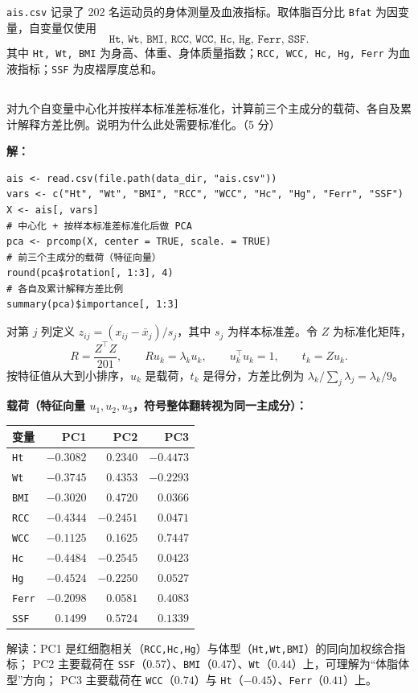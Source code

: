 \documentclass[12pt,a4paper]{article}
\begin{document}
\texttt{ais.csv} 记录了 202 名运动员的身体测量及血液指标。取体脂百分比 \texttt{Bfat} 为因变量，自变量仅使用
\[
  \texttt{Ht, Wt, BMI, RCC, WCC, Hc, Hg, Ferr, SSF}.
\]
其中 \texttt{Ht, Wt, BMI} 为身高、体重、身体质量指数；\texttt{RCC, WCC, Hc, Hg, Ferr} 为血液指标；\texttt{SSF} 为皮褶厚度总和。

\subsection{}

对九个自变量中心化并按样本标准差标准化，计算前三个主成分的载荷、各自及累计解释方差比例。说明为什么此处需要标准化。（5 分）

\begin{answerbox}
\textbf{解：}

\begin{lstlisting}[style=rcode]
ais <- read.csv(file.path(data_dir, "ais.csv"))
vars <- c("Ht", "Wt", "BMI", "RCC", "WCC", "Hc", "Hg", "Ferr", "SSF")
X <- ais[, vars]
# 中心化 + 按样本标准差标准化后做 PCA
pca <- prcomp(X, center = TRUE, scale. = TRUE)
# 前三个主成分的载荷（特征向量）
round(pca$rotation[, 1:3], 4)
# 各自及累计解释方差比例
summary(pca)$importance[, 1:3]  
\end{lstlisting}

对第 $j$ 列定义 $z_{ij}=(x_{ij}-\bar x_j)/s_j$，其中 $s_j$ 为样本标准差。令 $Z$ 为标准化矩阵，
$$
R=\frac{Z^\top Z}{201},\qquad Ru_k=\lambda_ku_k,\qquad
u_k^\top u_k=1,\qquad t_k=Zu_k.
$$
按特征值从大到小排序，$u_k$ 是载荷，$t_k$ 是得分，方差比例为 $\lambda_k/\sum_j\lambda_j=\lambda_k/9$。

\textbf{载荷（特征向量 $u_1,u_2,u_3$，符号整体翻转视为同一主成分）：}
\begin{center}
\small
\begin{tabular}{lrrr}
\toprule
变量 & PC1 & PC2 & PC3 \\
\midrule
\texttt{Ht} & $-0.3082$ & $0.2340$ & $-0.4473$ \\
\texttt{Wt} & $-0.3745$ & $0.4353$ & $-0.2293$ \\
\texttt{BMI} & $-0.3020$ & $0.4720$ & $0.0366$ \\
\texttt{RCC} & $-0.4344$ & $-0.2451$ & $0.0471$ \\
\texttt{WCC} & $-0.1125$ & $0.1625$ & $0.7447$ \\
\texttt{Hc} & $-0.4484$ & $-0.2545$ & $0.0423$ \\
\texttt{Hg} & $-0.4524$ & $-0.2250$ & $0.0527$ \\
\texttt{Ferr} & $-0.2098$ & $0.0581$ & $0.4083$ \\
\texttt{SSF} & $0.1499$ & $0.5724$ & $0.1339$ \\
\bottomrule
\end{tabular}
\end{center}
解读：PC1 是红细胞相关（\texttt{RCC,Hc,Hg}）与体型（\texttt{Ht,Wt,BMI}）的同向加权综合指标；
PC2 主要载荷在 \texttt{SSF}（$0.57$）、\texttt{BMI}（$0.47$）、\texttt{Wt}（$0.44$）上，可理解为``体脂体型''方向；
PC3 主要载荷在 \texttt{WCC}（$0.74$）与 \texttt{Ht}（$-0.45$）、\texttt{Ferr}（$0.41$）上。


\end{answerbox}
\end{document}
